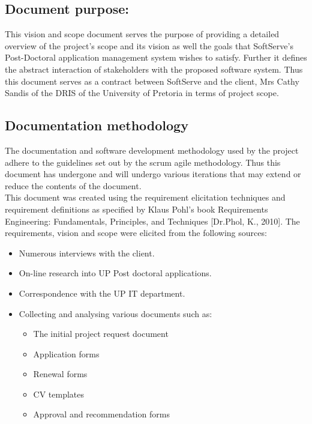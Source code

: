 \documentclass[12pt]{article}
\begin{document}
\subsection{Document purpose:}
\vspace{0.2in}
This vision and scope document serves the purpose of providing a detailed overview of the project's scope and its vision as well the goals that SoftServe's Post-Doctoral application management system wishes to satisfy. Further it defines the abstract interaction of stakeholders with the proposed software system. Thus this document serves as a contract between SoftServe and the client, Mrs Cathy Sandis of the DRIS of the University of Pretoria in terms of project scope.

\vspace{0.2in}

\subsection{Documentation methodology}
\vspace{0.2in}
\begin{flushleft}
The documentation and software development methodology used by the project adhere to the guidelines set out by the scrum agile methodology. Thus this document has undergone and will undergo various iterations that may extend or reduce the contents of the document.\\

This document was created using the requirement elicitation techniques and requirement definitions as specified by Klaus Pohl’s book Requirements Engineering: Fundamentals, Principles, and Techniques [Dr.Phol, K., 2010].
The requirements, vision and scope were elicited from the following sources:
\begin{itemize}
	\item Numerous interviews with the client.
	\item On-line research into UP Post doctoral applications.
	\item Correspondence with the UP IT department.
	\item Collecting and analysing various documents such as:
		\begin{itemize}
			\item The initial project request document
			\item Application forms
			\item Renewal forms
			\item CV templates
			\item Approval and recommendation forms
		\end{itemize}
\end{itemize}
\end{flushleft}	
\end{document}
